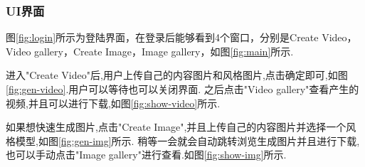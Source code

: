 \subsubsection{UI界面}
图\ref{fig:login}所示为登陆界面，在登录后能够看到4个窗口，分别是Create Video，Video gallery，Create Image，Image gallery，如图\ref{fig:main}所示.

进入"Create Video"后,用户上传自己的内容图片和风格图片,点击确定即可,如图\ref{fig:gen-video}.用户可以等待也可以关闭界面.
之后点击"Video gallery"查看产生的视频,并且可以进行下载,如图\ref{fig:show-video}所示.

如果想快速生成图片,点击"Create Image",并且上传自己的内容图片并选择一个风格模型,如图\ref{fig:gen-img}所示.
稍等一会就会自动跳转浏览生成图片并且进行下载,也可以手动点击"Image gallery"进行查看.如图\ref{fig:show-img}所示.
